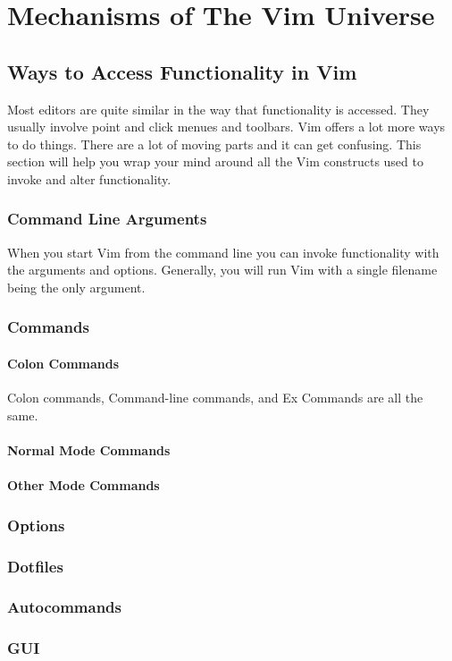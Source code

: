 \documentclass[12pt, oneside]{book}
\begin{document}
\chapter{Mechanisms of The Vim Universe}
\section{Ways to Access Functionality in Vim}
Most editors are quite similar in the way that functionality is accessed.  They usually involve point and click menues and toolbars.  Vim offers a lot more ways to do things.  There are a lot of
moving parts and it can get confusing.  This section will help you wrap your mind around all the Vim constructs used to invoke and alter functionality.
  \subsection{Command Line Arguments}
When you start Vim from the command line you can invoke functionality with the arguments and options.  Generally, you will run Vim with a single filename being the only argument.
  \subsection{Commands}
    \subsubsection{Colon Commands}
    Colon commands, Command-line commands, and Ex Commands are all the same.
    \subsubsection{Normal Mode Commands}
    \subsubsection{Other Mode Commands}
  \subsection{Options}
  \subsection{Dotfiles}
  \subsection{Autocommands}
  \subsection{GUI}
\end{document}
